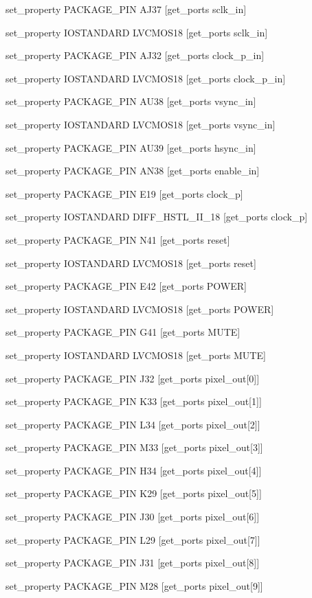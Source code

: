 
set\_property PACKAGE\_PIN AJ37 [get\_ports sclk\_in]

set\_property IOSTANDARD LVCMOS18 [get\_ports sclk\_in]

set\_property PACKAGE\_PIN AJ32 [get\_ports clock\_p\_in]

set\_property IOSTANDARD LVCMOS18 [get\_ports clock\_p\_in]

set\_property PACKAGE\_PIN AU38 [get\_ports vsync\_in]

set\_property IOSTANDARD LVCMOS18 [get\_ports vsync\_in]

set\_property PACKAGE\_PIN AU39 [get\_ports hsync\_in]

set\_property PACKAGE\_PIN AN38 [get\_ports enable\_in]

set\_property PACKAGE\_PIN E19 [get\_ports clock\_p]

set\_property IOSTANDARD DIFF\_HSTL\_II\_18 [get\_ports clock\_p]

set\_property PACKAGE\_PIN N41 [get\_ports reset]

set\_property IOSTANDARD LVCMOS18 [get\_ports reset]

set\_property PACKAGE\_PIN E42 [get\_ports POWER]

set\_property IOSTANDARD LVCMOS18 [get\_ports POWER]

set\_property PACKAGE\_PIN G41 [get\_ports MUTE]

set\_property IOSTANDARD LVCMOS18 [get\_ports MUTE]


set\_property PACKAGE\_PIN J32 [get\_ports {pixel\_out[0]}]

set\_property PACKAGE\_PIN K33 [get\_ports {pixel\_out[1]}]

set\_property PACKAGE\_PIN L34 [get\_ports {pixel\_out[2]}]

set\_property PACKAGE\_PIN M33 [get\_ports {pixel\_out[3]}]

set\_property PACKAGE\_PIN H34 [get\_ports {pixel\_out[4]}]

set\_property PACKAGE\_PIN K29 [get\_ports {pixel\_out[5]}]

set\_property PACKAGE\_PIN J30 [get\_ports {pixel\_out[6]}]


set\_property PACKAGE\_PIN L29 [get\_ports {pixel\_out[7]}]

set\_property PACKAGE\_PIN J31 [get\_ports {pixel\_out[8]}]

set\_property PACKAGE\_PIN M28 [get\_ports {pixel\_out[9]}]

